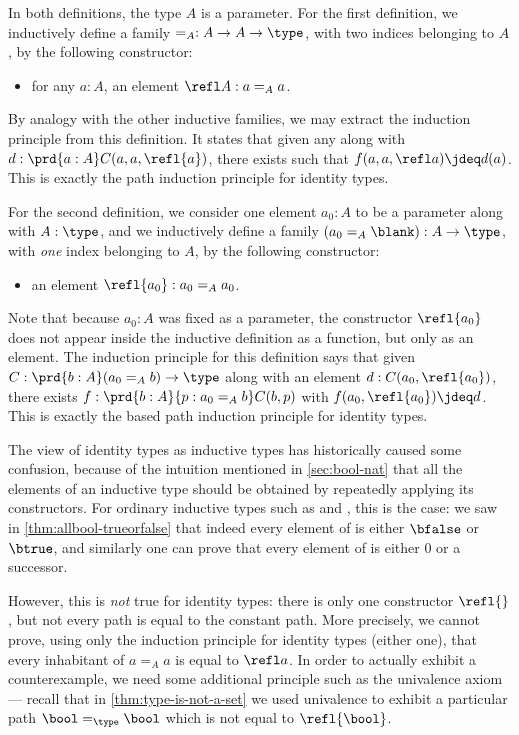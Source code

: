 In both definitions, the type $A$ is a parameter.
For the first definition, we inductively define a family $=_A : A\to A\to \type$, with two indices belonging to $A$, by the following constructor:
\begin{itemize}
\item for any $a:A$, an element $\refl A : a=_A a$.
\end{itemize}
By analogy with the other inductive families, we may extract the induction principle from this definition.
It states that given any  along with $d:\prd{a:A} C(a,a,\refl{a})$, there exists  such that $f(a,a,\refl a)\jdeq d(a)$.
This is exactly the path induction principle for identity types.

For the second definition, we consider one element $a_0:A$ to be a parameter along with $A:\type$, and we inductively define a family $(a_0 =_A \blank):A\to \type$, with \emph{one} index belonging to $A$, by the following constructor:
\begin{itemize}
\item an element $\refl{a_0} : a_0 =_A a_0$.
\end{itemize}
Note that because $a_0:A$ was fixed as a parameter, the constructor $\refl{a_0}$ does not appear inside the inductive definition as a function, but only as an element.
The induction principle for this definition says that given $C:\prd{b:A} (a_0 =_A b) \to \type$ along with an element $d:C(a_0,\refl{a_0})$, there exists $f:\prd{b:A}{p:a_0 =_A b} C(b,p)$ with $f(a_0,\refl{a_0})\jdeq d$.
This is exactly the based path induction principle for identity types.

The view of identity types as inductive types has historically caused some confusion, because of the intuition mentioned in \cref{sec:bool-nat} that all the elements of an inductive type should be obtained by repeatedly applying its constructors.
For ordinary inductive types such as \bool and \nat, this is the case: we saw in \cref{thm:allbool-trueorfalse} that indeed every element of \bool is either $\bfalse$ or $\btrue$, and similarly one can prove that every element of \nat is either $0$ or a successor.

However, this is \emph{not} true for identity types: there is only one constructor $\refl{}$, but not every path is equal to the constant path.
More precisely, we cannot prove, using only the induction principle for identity types (either one), that every inhabitant of $a=_A a$ is equal to $\refl a$.
In order to actually exhibit a counterexample, we need some additional principle such as the univalence axiom --- recall that in \cref{thm:type-is-not-a-set} we used univalence to exhibit a particular path $\bool=_\type\bool$ which is not equal to $\refl{\bool}$.

